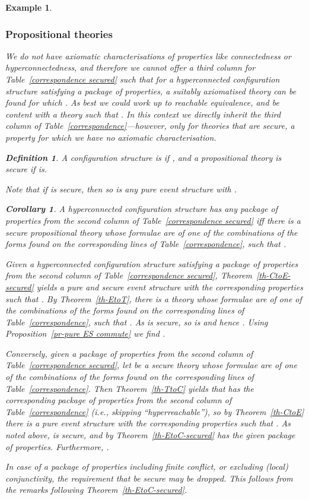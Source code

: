 \documentclass[twocolumn]{article}
\newtheorem{defi}{Definition}[section]
\newtheorem{coro}{Corollary}
\newtheorem{exam}{Example}
\newenvironment{definition}[1]{\begin{defi} \rm \label{df-#1} }{\end{defi}}
\newenvironment{corollary}[1]{\begin{coro} \rm \label{cor-#1} }{\end{coro}}
\newenvironment{example}[1]{\begin{exam} \rm \label{ex-#1} }{\end{exam}}
\newenvironment{proof}{\begin{trivlist} \item[\hspace{\labelsep}\bf
Proof:]}{\hfill \end{trivlist}}
\newcommand{\thm}[1]{Theorem~\ref{th-#1}}
\newcommand{\pr}[1]{Proposition~\ref{pr-#1}}
\newcommand{\phrase}[1]{\index{#1}{\em #1}}		\newcommand{\implies}{\Rightarrow}
\begin{document}
\begin{example}{causality}
\begin{proof}
\subsubsection*{Propositional theories}

We do not have axiomatic characterisations of properties like
connectedness or hyperconnectedness, and therefore we cannot offer a
third column for Table~\ref{correspondence secured} such that for
 a hyperconnected configuration structure satisfying a package of
properties, a suitably axiomatised  theory can be found for which
. 
As best we could work up to reachable equivalence, and be content with
a theory  such that .
In this context we directly inherit the third column of
Table~\ref{correspondence}---however, only for theories that are
\emph{secure}, a property for which we have no axiomatic characterisation.
\begin{definition}{secure-PT}
A configuration structure  is \phrase{secure} if
, and a propositional theory  is \emph{secure}
if  is.
\end{definition}
Note that if  is secure, then so is any pure event structure
 with .

\begin{corollary}{CtoT-secured}
A hyperconnected configuration structure  has any package of
properties from the second column of Table~\ref{correspondence secured} iff
there is a secure propositional theory  whose formulae are of
one of the combinations of the forms found on the corresponding lines
of Table~\ref{correspondence}, such that .
\end{corollary}

\begin{proof}
Given a hyperconnected configuration structure  satisfying a
package of properties from the second column of
Table~\ref{correspondence secured}, \thm{CtoE-secured} yields a pure
and secure event structure with the corresponding properties such that
. By \thm{EtoT}, there is a theory  whose formulae are of
one of the combinations of the forms found on the corresponding lines
of Table~\ref{correspondence}, such that .
As  is secure, so is  and hence .
Using \pr{pure ES commute} we find .

Conversely, given a package of properties from the second column of
Table~\ref{correspondence secured}, let  be a secure theory whose
formulae are of one of the combinations of the forms found on the
corresponding lines of Table~\ref{correspondence}.
Then \thm{TtoC} yields that  has the corresponding package of
properties from  the second column of Table~\ref{correspondence}
(i.e., skipping ``hyperreachable''), so by \thm{CtoE} there is a pure
event structure  with the corresponding properties such that
. As noted above,  is secure, and by
\thm{EtoC-secured}  has the given package of properties. Furthermore,
.
\end{proof}
In case of a package of properties including finite conflict, or
excluding (local) conjunctivity, the requirement that  be secure
may be dropped. This follows from the remarks following \thm{EtoC-secured}.


\end{proof}
\end{example}
\end{document}
